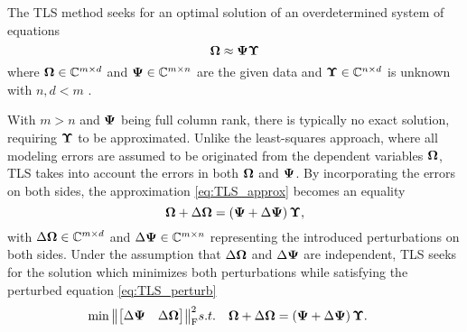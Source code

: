 The TLS method seeks for an optimal solution of an overdetermined system of equations 
\begin{equation} \label{eq:TLS_approx}
	\Mone \approx \Mtwo \Mthree
\end{equation}
where $\bm{\Omega} \in {\mathbb{C}}^{m \times d}$ and $\bm{\Psi} \in {\mathbb{C}}^{m \times n}$ are the given data and $\bm{\Upsilon} \in {\mathbb{C}}^{n \times d}$ is unknown with $n, d < m$ \cite{Markovsky07TLS}. \par

With $m > n$ and $\bm{\Psi}$ being full column rank, there is typically no exact solution, requiring $\bm{\Upsilon}$ to be approximated. Unlike the least-squares approach, where all modeling errors are assumed to be originated from the dependent variables $\bm{\Omega}$, TLS takes into account the errors in both $\bm{\Omega}$ and $\bm{\Psi}$.  By incorporating the errors on both sides, the approximation \eqref{eq:TLS_approx} becomes an equality
\begin{equation} \label{eq:TLS_perturb}
	\MonePerturb = \left( \MtwoPerturb \right) \Mthree,
\end{equation} 
with $\Delta \bm{\Omega} \in {\mathbb{C}}^{m \times d}$ and $\Delta \bm{\Psi} \in {\mathbb{C}}^{m \times n}$ representing the introduced perturbations on both sides.
Under the assumption that $\Delta \bm{\Omega}$ and $\Delta \bm{\Psi}$ are independent, TLS seeks for the solution which minimizes both perturbations while satisfying the perturbed equation \eqref{eq:TLS_perturb} \cite{Markovsky07TLS} 
\begin{eqnarray} \label{eq:TLS_costfct}
	\hspace*{-0.4cm} \min \norm{\begin{bmatrix}\MtwoDelta & \MoneDelta \end{bmatrix}}_{\Frob}^{2} &
	\mbox{s.t.} & 
	\MonePerturb = \left( \MtwoPerturb \right) \Mthree .
\end{eqnarray} \par


